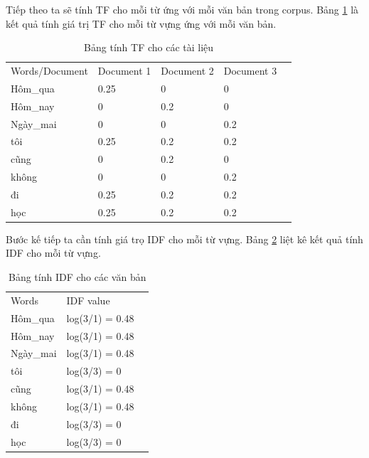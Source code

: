 Tiếp theo ta sẽ tính TF cho mỗi từ ứng với mỗi văn bản trong corpus. Bảng \ref{tab:sec3caltf} là kết quả tính giá trị TF cho mỗi từ vựng ứng với mỗi văn bản.

\begin{table}[h!]
\centering
\begin{tabular}{|l|l|l|l|l}
\cline{1-4}
Words/Document & Document 1 & Document 2 & Document 3 &  \\ \cline{1-4}
Hôm\_qua          & 0.25       & 0       & 0       &  \\ \cline{1-4}
Hôm\_nay          & 0       & 0.2          & 0       &  \\ \cline{1-4}
Ngày\_mai          & 0       & 0       & 0.2          &  \\ \cline{1-4}
tôi              & 0.25          & 0.2       & 0.2       &  \\ \cline{1-4}
cũng             & 0          & 0.2       &  0      &  \\ \cline{1-4}
không             & 0       & 0          & 0.2          &  \\ \cline{1-4}
đi             & 0.25       & 0.2          & 0.2          &  \\ \cline{1-4}
học           & 0.25       & 0.2          & 0.2          &  \\ \cline{1-4}
\end{tabular}
\caption{Bảng tính TF cho các tài liệu}
\label{tab:sec3caltf}
\end{table}

Bước kế tiếp ta cần tính giá trọ IDF cho mỗi từ vựng. Bảng \ref{tab:sec3calidf} liệt kê kết quả tính IDF cho mỗi từ vựng.

\begin{table}[h!]
\centering
\begin{tabular}{|l|l|l}
\cline{1-2}
Words & IDF value &  \\ \cline{1-2}
Hôm\_qua & log(3/1) = 0.48 &  \\ \cline{1-2}
Hôm\_nay    & log(3/1) = 0.48 &  \\ \cline{1-2}
Ngày\_mai & log(3/1) = 0.48 &  \\ \cline{1-2}
tôi     & log(3/3) = 0  &  \\ \cline{1-2}
cũng    & log(3/1) = 0.48 &  \\ \cline{1-2}
không    & log(3/1) = 0.48 &  \\ \cline{1-2}
đi    & log(3/3) = 0 &  \\ \cline{1-2}
học  & log(3/3) = 0 &  \\ \cline{1-2}
\end{tabular}
\caption{Bảng tính IDF cho các văn bản}
\label{tab:sec3calidf}
\end{table}

